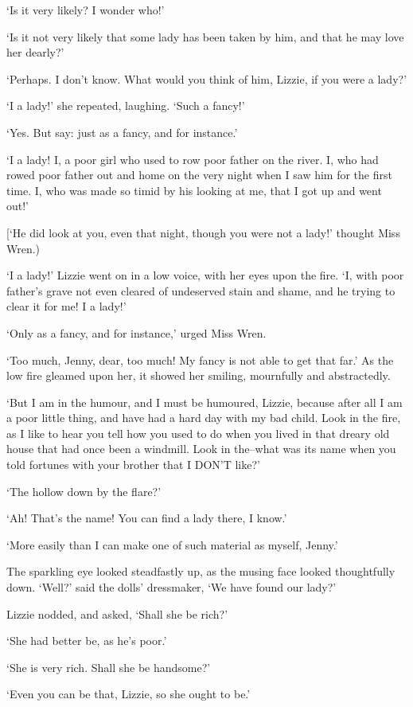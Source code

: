 ‘Is it very likely? I wonder who!’

‘Is it not very likely that some lady has been taken by him, and that he
may love her dearly?’

‘Perhaps. I don’t know. What would you think of him, Lizzie, if you were
a lady?’

‘I a lady!’ she repeated, laughing. ‘Such a fancy!’

‘Yes. But say: just as a fancy, and for instance.’

‘I a lady! I, a poor girl who used to row poor father on the river. I,
who had rowed poor father out and home on the very night when I saw him
for the first time. I, who was made so timid by his looking at me, that
I got up and went out!’

[‘He did look at you, even that night, though you were not a lady!’
thought Miss Wren.)

‘I a lady!’ Lizzie went on in a low voice, with her eyes upon the fire.
‘I, with poor father’s grave not even cleared of undeserved stain and
shame, and he trying to clear it for me! I a lady!’

‘Only as a fancy, and for instance,’ urged Miss Wren.

‘Too much, Jenny, dear, too much! My fancy is not able to get that far.’
As the low fire gleamed upon her, it showed her smiling, mournfully and
abstractedly.

‘But I am in the humour, and I must be humoured, Lizzie, because after
all I am a poor little thing, and have had a hard day with my bad child.
Look in the fire, as I like to hear you tell how you used to do when you
lived in that dreary old house that had once been a windmill. Look in
the--what was its name when you told fortunes with your brother that I
DON’T like?’

‘The hollow down by the flare?’

‘Ah! That’s the name! You can find a lady there, I know.’

‘More easily than I can make one of such material as myself, Jenny.’

The sparkling eye looked steadfastly up, as the musing face looked
thoughtfully down. ‘Well?’ said the dolls’ dressmaker, ‘We have found
our lady?’

Lizzie nodded, and asked, ‘Shall she be rich?’

‘She had better be, as he’s poor.’

‘She is very rich. Shall she be handsome?’

‘Even you can be that, Lizzie, so she ought to be.’

